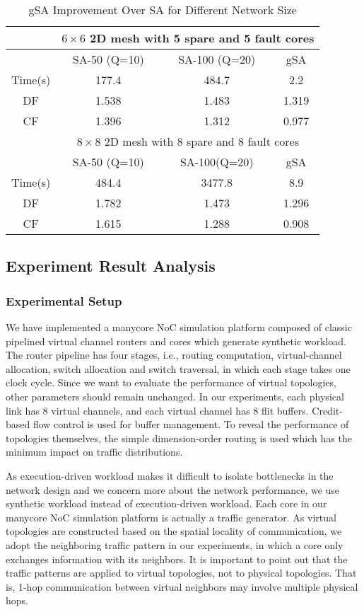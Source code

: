 \begin{table}
    \caption{gSA Improvement Over SA for Different Network Size}
    \begin{tabular}{c|ccc}
        \hline
         & \multicolumn{3}{c}{$6 \times 6$ 2D mesh with 5 spare and 5 fault cores} \\ \hline
         & SA-50 (Q=10) & SA-100 (Q=20)  & gSA  \\
 Time(s) & 177.4        &  484.7         &  2.2   \\
 DF      & 1.538        &  1.483         &  1.319 \\
 CF      & 1.396        &  1.312         &  0.977 \\ \hline
         & \multicolumn{3}{c}{$8 \times 8$ 2D mesh with 8 spare and 8 fault cores } \\ \hline
         & SA-50 (Q=10) & SA-100(Q=20)   & gSA  \\
 Time(s) & 484.4        & 3477.8         & 8.9    \\
 DF      & 1.782        & 1.473          & 1.296  \\
 CF      & 1.615        & 1.288          & 0.908  \\ \hline
    \end{tabular}
    \label{tab:gSA-Improve}
\end{table}

\subsection{Experiment Result Analysis}
\subsubsection{Experimental Setup}
We have implemented a manycore NoC simulation platform composed of classic pipelined virtual channel routers and cores which generate synthetic workload. The router pipeline has four stages, i.e., routing computation, virtual-channel allocation, switch allocation and switch traversal, in which each stage takes one clock cycle. Since we want to evaluate the performance of virtual topologies, other parameters should remain unchanged. In our experiments, each physical link has 8 virtual channels, and each virtual channel has 8 flit buffers. Credit-based flow control is used for buffer management. To reveal the performance of topologies themselves, the simple dimension-order routing is used which has the minimum impact on traffic distributions.

As execution-driven workload makes it difficult to isolate bottlenecks in the network design \cite{dally2004principles} and we concern more about the network performance, we use synthetic workload instead of execution-driven workload. Each core in our manycore NoC simulation platform is actually a traffic generator. As virtual topologies are constructed based on the spatial locality of communication, we adopt the neighboring traffic pattern in our experiments, in which a core only exchanges information with its neighbors. It is important to point out that the traffic patterns are applied to virtual topologies, not to physical topologies. That is, 1-hop communication between virtual neighbors may involve multiple physical hops.

